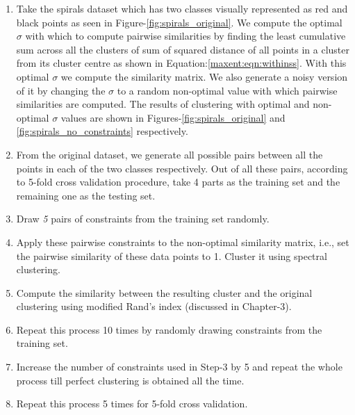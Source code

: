 \begin{enumerate}
 \item Take the spirals dataset which has two classes visually represented as red and black points as seen in Figure-\ref{fig:spirals_original}. 
We compute the optimal $\sigma$ with which to compute pairwise similarities by finding the least cumulative sum across all the clusters of sum of squared 
distance of all points in a cluster from its cluster centre as shown in Equation:\ref{maxent:eqn:withinss}. With this optimal $\sigma$ we compute the similarity matrix. 
We also generate a noisy version of it by changing the $\sigma$ to a random non-optimal value with which pairwise similarities are computed. 
The results of clustering with optimal and non-optimal $\sigma$ values are shown in Figures-\ref{fig:spirals_original} and \ref{fig:spirals_no_constraints} respectively.
 \item From the original dataset, we generate all possible pairs between all the points in each of the two classes respectively. Out of all these pairs, according to 5-fold cross validation procedure, take 4 parts as the training set and the remaining one as the testing set.
 \item Draw \textit{5} pairs of constraints from the training set randomly.
 \item Apply these pairwise constraints to the non-optimal similarity matrix, i.e., set the pairwise similarity of these data points to 1. Cluster it using spectral clustering.
 \item Compute the similarity between the resulting cluster and the original clustering using modified Rand's index (discussed in Chapter-3).
 \item Repeat this process 10 times by randomly drawing constraints from the training set.
 \item Increase the number of constraints used in Step-3 by 5 and repeat the whole process till perfect clustering is obtained all the time.
 \item Repeat this process 5 times for 5-fold cross validation.
 \end{enumerate}



